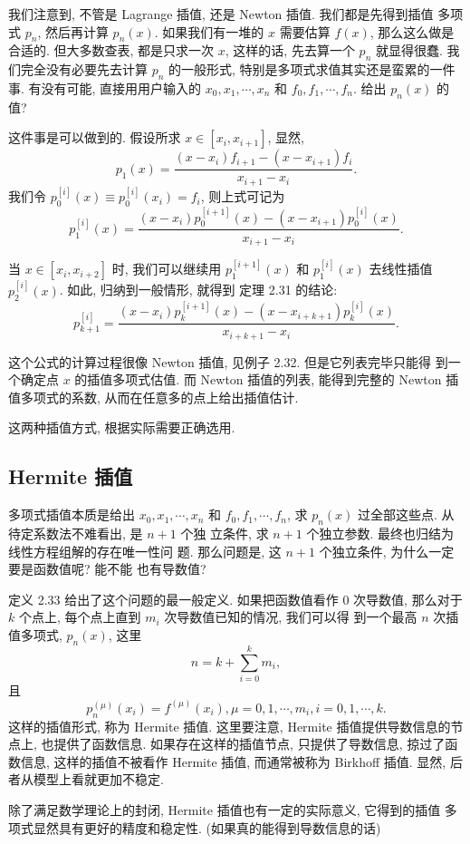 \documentclass[a4paper]{ctexart}
\begin{document}
我们注意到, 不管是 Lagrange 插值, 还是 Newton 插值. 我们都是先得到插值
多项式 $p_n$, 然后再计算 $p_n(x)$. 如果我们有一堆的 $x$ 需要估算
$f(x)$, 那么这么做是合适的. 但大多数查表, 都是只求一次 $x$, 这样的话,
先去算一个 $p_n$ 就显得很蠢. 我们完全没有必要先去计算 $p_n$ 的一般形式,
特别是多项式求值其实还是蛮累的一件事. 有没有可能, 直接用用户输入的 $x_0, x_1, \cdots, x_n$ 和 $f_0, f_1,
\cdots, f_n$. 给出 $p_n(x)$ 的值?

这件事是可以做到的. 假设所求 $x \in [x_i, x_{i + 1}]$, 显然,
$$
p_1(x) = \frac{(x - x_i)f_{i + 1} - (x - x_{i + 1})f_i}{x_{i + 1} - x_i}.
$$
我们令 $p_0^{[i]}(x) \equiv p_0^{[i]}(x_i) = f_i$, 则上式可记为
$$
p_1^{[i]}(x) = \frac{(x - x_i)p_0^{[i + 1]}(x) - (x - x_{i + 1})p_0^{[i]}(x)}{x_{i + 1} - x_i}.
$$

当 $x \in [x_i, x_{i + 2}]$ 时, 我们可以继续用 $p_1^{[i + 1]}(x)$ 和
$p_1^{[i]}(x)$ 去线性插值 $p_2^{[i]}(x)$. 如此, 归纳到一般情形, 就得到
定理 2.31 的结论:
$$
p_{k + 1}^{[i]} = \frac{(x - x_i)p_k^{[i + 1]}(x) - (x - x_{i + k + 1})p_k^{[i]}(x)}{x_{i + k + 1} - x_i}.
$$

这个公式的计算过程很像 Newton 插值, 见例子 2.32. 但是它列表完毕只能得
到一个确定点 $x$ 的插值多项式估值. 而 Newton 插值的列表, 能得到完整的
Newton 插值多项式的系数, 从而在任意多的点上给出插值估计.

这两种插值方式, 根据实际需要正确选用. 

\subsection{Hermite 插值}

多项式插值本质是给出 $x_0, x_1, \cdots, x_n$ 和 $f_0, f_1, \cdots,
f_n$, 求 $p_n(x)$ 过全部这些点. 从待定系数法不难看出, 是 $n + 1$ 个独
立条件, 求 $n + 1$ 个独立参数. 最终也归结为线性方程组解的存在唯一性问
题. 那么问题是, 这 $n + 1$ 个独立条件, 为什么一定要是函数值呢? 能不能
也有导数值?

定义 2.33 给出了这个问题的最一般定义. 如果把函数值看作 $0$ 次导数值,
那么对于 $k$ 个点上, 每个点上直到 $m_i$ 次导数值已知的情况, 我们可以得
到一个最高 $n$ 次插值多项式, $p_n(x)$, 这里
$$
n = k + \sum_{i = 0}^k m_i,
$$
且
$$
p_n^{(\mu)}(x_i) = f^{(\mu)}(x_i), \mu = 0, 1, \cdots, m_i, i = 0, 1, \cdots, k.
$$
这样的插值形式, 称为 Hermite 插值. 这里要注意, Hermite 插值提供导数信息的节点上, 
也提供了函数信息. 如果存在这样的插值节点, 只提供了导数信息, 掠过了函数信息, 
这样的插值不被看作 Hermite 插值, 而通常被称为 Birkhoff 插值. 显然, 后者从模型上看就更加不稳定.

除了满足数学理论上的封闭, Hermite 插值也有一定的实际意义, 它得到的插值
多项式显然具有更好的精度和稳定性. (如果真的能得到导数信息的话)
\end{document}

